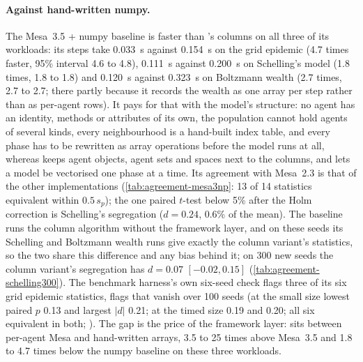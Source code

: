 \paragraph{Against hand-written numpy.} The Mesa~3.5 + numpy baseline is faster than
\modelly{}'s columns on all three of its workloads: its steps take 0.033~s against 0.154~s on
the grid epidemic (4.7 times faster, 95\% interval 4.6 to 4.8), 0.111~s against 0.200~s on
Schelling's model (1.8 times, 1.8 to 1.8) and 0.120~s against 0.323~s on Boltzmann wealth (2.7
times, 2.7 to 2.7; there partly because it records the wealth as one array per step rather than
as per-agent rows). It pays for that with the model's structure: no agent has an identity,
methods or attributes of its own, the population cannot hold agents of several kinds, every
neighbourhood is a hand-built index table, and every phase has to be rewritten as array
operations before the model runs at all, whereas \modelly{} keeps agent objects, agent sets and
spaces next to the columns, and lets a model be vectorised one phase at a time. Its agreement
with Mesa~2.3 is that of the other implementations (\cref{tab:agreement-mesa3np}: 13 of 14
statistics equivalent within $0.5\,s_p$); the one paired $t$-test below 5\% after the Holm
correction is Schelling's segregation ($d = 0.24$, 0.6\% of the mean). The baseline runs the
column algorithm without the framework layer, and on these seeds its Schelling and Boltzmann
wealth runs give exactly the column variant's statistics, so the two share this difference
and any bias behind it; on 300 new seeds the column variant's segregation has $d = 0.07$
$[-0.02, 0.15]$ (\cref{tab:agreement-schelling300}). The benchmark harness's own six-seed
check flags three of its six grid epidemic statistics, flags that vanish over 100 seeds (at the
small size lowest paired $p$ 0.13 and largest $|d|$ 0.21; at the timed size 0.19 and 0.20;
all six equivalent in both; ). The gap is the price of the
framework layer: \modelly{} sits between per-agent Mesa and hand-written arrays,
3.5 to 25 times above Mesa~3.5 and 1.8 to 4.7 times below the numpy baseline on these three workloads.

